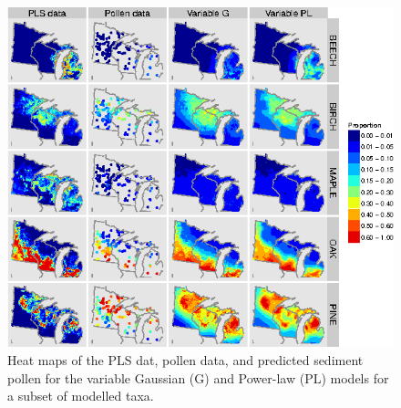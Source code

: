 \begin{figure}
\centering
\includegraphics[width=7in]{figures/map_pls_pollen.png}
\caption{Heat maps of the PLS dat, pollen data, and predicted sediment
  pollen for the variable Gaussian (G) and Power-law (PL) models for a
  subset of modelled taxa.}
\label{fig:maps_pp}
\end{figure}

